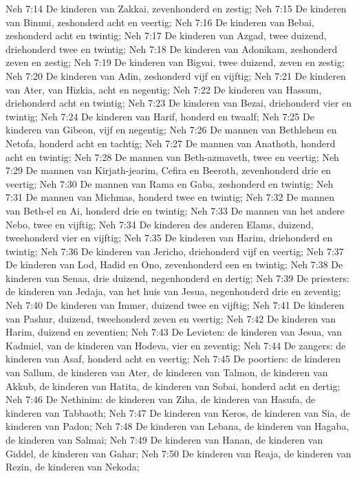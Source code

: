 Neh 7:14  De kinderen van Zakkai, zevenhonderd en zestig;
Neh 7:15  De kinderen van Binnui, zeshonderd acht en veertig;
Neh 7:16  De kinderen van Bebai, zeshonderd acht en twintig;
Neh 7:17  De kinderen van Azgad, twee duizend, driehonderd twee en twintig;
Neh 7:18  De kinderen van Adonikam, zeshonderd zeven en zestig;
Neh 7:19  De kinderen van Bigvai, twee duizend, zeven en zestig;
Neh 7:20  De kinderen van Adin, zeshonderd vijf en vijftig;
Neh 7:21  De kinderen van Ater, van Hizkia, acht en negentig;
Neh 7:22  De kinderen van Hassum, driehonderd acht en twintig;
Neh 7:23  De kinderen van Bezai, driehonderd vier en twintig;
Neh 7:24  De kinderen van Harif, honderd en twaalf;
Neh 7:25  De kinderen van Gibeon, vijf en negentig;
Neh 7:26  De mannen van Bethlehem en Netofa, honderd acht en tachtig;
Neh 7:27  De mannen van Anathoth, honderd acht en twintig;
Neh 7:28  De mannen van Beth-azmaveth, twee en veertig;
Neh 7:29  De mannen van Kirjath-jearim, Cefira en Beeroth, zevenhonderd drie en veertig;
Neh 7:30  De mannen van Rama en Gaba, zeshonderd en twintig;
Neh 7:31  De mannen van Michmas, honderd twee en twintig;
Neh 7:32  De mannen van Beth-el en Ai, honderd drie en twintig;
Neh 7:33  De mannen van het andere Nebo, twee en vijftig;
Neh 7:34  De kinderen des anderen Elams, duizend, tweehonderd vier en vijftig;
Neh 7:35  De kinderen van Harim, driehonderd en twintig;
Neh 7:36  De kinderen van Jericho, driehonderd vijf en veertig;
Neh 7:37  De kinderen van Lod, Hadid en Ono, zevenhonderd een en twintig;
Neh 7:38  De kinderen van Senaa, drie duizend, negenhonderd en dertig;
Neh 7:39  De priesters: de kinderen van Jedaja, van het huis van Jesua, negenhonderd drie en zeventig;
Neh 7:40  De kinderen van Immer, duizend twee en vijftig;
Neh 7:41  De kinderen van Pashur, duizend, tweehonderd zeven en veertig;
Neh 7:42  De kinderen van Harim, duizend en zeventien;
Neh 7:43  De Levieten: de kinderen van Jesua, van Kadmiel, van de kinderen van Hodeva, vier en zeventig;
Neh 7:44  De zangers: de kinderen van Asaf, honderd acht en veertig;
Neh 7:45  De poortiers: de kinderen van Sallum, de kinderen van Ater, de kinderen van Talmon, de kinderen van Akkub, de kinderen van Hatita, de kinderen van Sobai, honderd acht en dertig;
Neh 7:46  De Nethinim: de kinderen van Ziha, de kinderen van Hasufa, de kinderen van Tabbaoth;
Neh 7:47  De kinderen van Keros, de kinderen van Sia, de kinderen van Padon;
Neh 7:48  De kinderen van Lebana, de kinderen van Hagaba, de kinderen van Salmai;
Neh 7:49  De kinderen van Hanan, de kinderen van Giddel, de kinderen van Gahar;
Neh 7:50  De kinderen van Reaja, de kinderen van Rezin, de kinderen van Nekoda;

